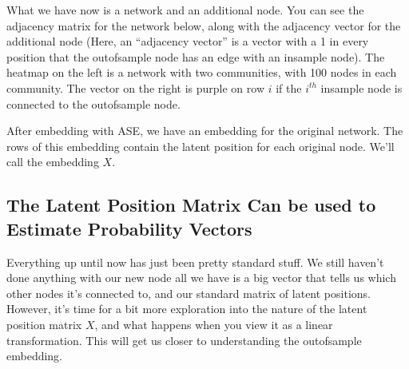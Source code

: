\documentclass[letterpaper,10pt,english]{jupyterBook}
\begin{document}
\sphinxAtStartPar
What we have now is a network and an additional node. You can see the adjacency matrix for the network below, along with the adjacency vector for the additional node (Here, an “adjacency vector”  is a vector with a 1 in every position that the out\sphinxhyphen{}of\sphinxhyphen{}sample node has an edge with an in\sphinxhyphen{}sample node). The heatmap on the left is a network with two communities, with 100 nodes in each community. The vector on the right is purple on row \(i\) if the \(i^{th}\) in\sphinxhyphen{}sample node is connected to the out\sphinxhyphen{}of\sphinxhyphen{}sample node.

\noindent{}

\sphinxAtStartPar
After embedding with ASE, we have an embedding for the original network. The rows of this embedding contain the latent position for each original node. We’ll call the embedding \(X\).

\begin{sphinxVerbatim}[commandchars=\\\{\}]
     

  
  
\end{sphinxVerbatim}

\noindent{}


\subsection{The Latent Position Matrix Can be used to Estimate Probability Vectors}
\label{\detokenize{applications/ch8/out-of-sample:the-latent-position-matrix-can-be-used-to-estimate-probability-vectors}}
\sphinxAtStartPar
Everything up until now has just been pretty standard stuff. We still haven’t done anything with our new node \sphinxhyphen{} all we have is a big vector that tells us which other nodes it’s connected to, and our standard matrix of latent positions. However, it’s time for a bit more exploration into the nature of the latent position matrix \(X\), and what happens when you view it as a linear transformation. This will get us closer to understanding the out\sphinxhyphen{}of\sphinxhyphen{}sample embedding.
\end{document}
